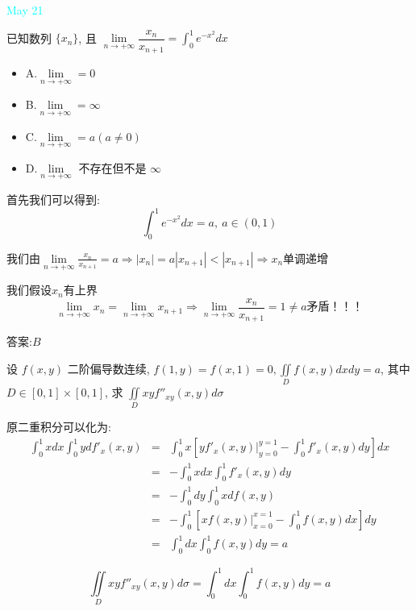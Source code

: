 \textcolor{cyan}{May 21}

\begin{example}[][Exam: 31.3.13]
	已知数列 $\{x_{n}\}$, 且 $\lim\limits_{n\to +\infty}\dfrac{x_{n}}{x_{n+1}}=\int_{0}^{1}e^{-x^2}dx$ 
\begin{itemize}
	\item A.$\lim\limits_{n\to +\infty}=0$
	\item B.$\lim\limits_{n\to +\infty}=\infty$
	\item C.$\lim\limits_{n\to +\infty}=a(a\neq 0)$
	\item D.$\lim\limits_{n\to +\infty}$ 不存在但不是 $\infty$
\end{itemize}
\end{example}

\begin{solution}
	
	首先我们可以得到: 
	$$\int_{0}^{1}e^{-x^2}dx=a,\ a\in(0,1)$$
	
	我们由$\lim\limits_{n\to +\infty}\frac{x_{n}}{x_{n+1}}=a\Rightarrow |x_{n}|=a|x_{n+1}|<|x_{n+1}|\Rightarrow x_{n}\text{单调递增}$
	
	我们假设$x_{n}$有上界
	$$\lim\limits_{n\to +\infty}x_{n}=\lim\limits_{n\to +\infty}x_{n+1}\Rightarrow \lim\limits_{n\to +\infty}\frac{x_{n}}{x_{n+1}}=1\neq a\text{矛盾！！！}$$
	
	答案:$B$
\end{solution}

\begin{example}[][Exam: 31.3.14]
	设 $f(x,y)$ 二阶偏导数连续, $f(1,y)=f(x,1)=0,\iint\limits_{D}f(x,y)dxdy=a$, 其中 $D\in [0,1]\times [0,1]$,
	求 $\iint\limits_{D}xyf''_{xy}(x,y)d\sigma$
\end{example}

\begin{solution}
	
	原二重积分可以化为: 
	\begin{eqnarray*}
		\int_{0}^{1}xdx\int_{0}^{1}ydf'_{x}(x,y)&=&\int_{0}^{1}x\left[yf'_{x}(x,y)|_{y=0}^{y=1}-\int_{0}^{1}f'_{x}(x,y)dy\right]dx\\
		&=&-\int_{0}^{1}xdx\int_{0}^{1}f'_{x}(x,y)dy\\
		&=&-\int_{0}^{1}dy\int_{0}^{1}xdf(x,y)\\
		&=&-\int_{0}^{1}\left[xf(x,y)|_{x=0}^{x=1}-\int_{0}^{1}f(x,y)dx\right]dy\\
		&=&\int_{0}^{1}dx\int_{0}^{1}f(x,y)dy=a
	\end{eqnarray*}
	
	$$\iint\limits_{D}xyf''_{xy}(x,y)d\sigma=\int_{0}^{1}dx\int_{0}^{1}f(x,y)dy=a$$
\end{solution}


